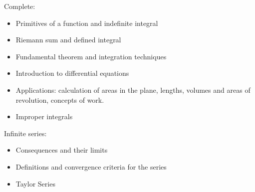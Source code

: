 Complete:
\begin{itemize}
    \item Primitives of a function and indefinite integral
    \item Riemann sum and defined integral
    \item Fundamental theorem and integration techniques
    \item Introduction to differential equations
    \item Applications: calculation of areas in the plane, lengths, volumes and areas of revolution, concepts of work.
    \item Improper integrals
\end{itemize}
Infinite series:
\begin{itemize}
    \item Consequences and their limits
    \item Definitions and convergence criteria for the series
    \item Taylor Series
\end{itemize}